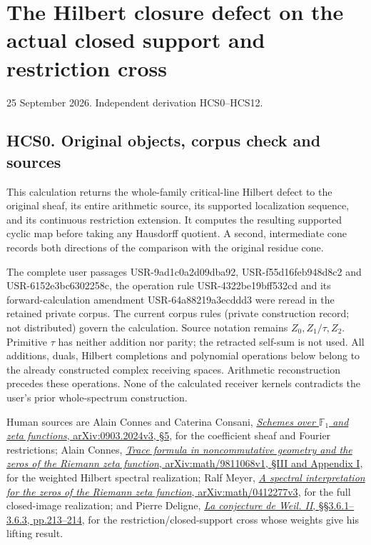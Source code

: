 \section{The Hilbert closure defect on the actual closed support and
restriction
cross}\label{the-hilbert-closure-defect-on-the-actual-closed-support-and-restriction-cross}

25 September 2026. Independent derivation HCS0--HCS12.

\subsection{HCS0. Original objects, corpus check and
sources}\label{hcs0.-original-objects-corpus-check-and-sources}

This calculation returns the whole-family critical-line Hilbert defect
to the original sheaf, its entire arithmetic source, its supported
localization sequence, and its continuous restriction extension. It
computes the resulting supported cyclic map before taking any Hausdorff
quotient. A second, intermediate cone records both directions of the
comparison with the original residue cone.

The complete user passages USR-9ad1c0a2d09dba92, USR-f55d16feb948d8c2
and USR-6152e3bc6302258c, the operation rule USR-4322be19bff532cd and
its forward-calculation amendment USR-64a88219a3ecddd3 were reread in
the retained private corpus. The current corpus rules (private
construction record; not distributed) govern the calculation. Source
notation remains \(Z_0,Z_1/\tau,Z_2\). Primitive \(\tau\) has neither
addition nor parity; the retracted self-sum is not used. All additions,
duals, Hilbert completions and polynomial operations below belong to the
already constructed complex receiving spaces. Arithmetic reconstruction
precedes these operations. None of the calculated receiver kernels
contradicts the user's prior whole-spectrum construction.

Human sources are Alain Connes and Caterina Consani,
\href{https://arxiv.org/abs/0903.2024v3}{\emph{Schemes over
\(\mathbb F_1\) and zeta functions}, arXiv:0903.2024v3, §5}, for the
coefficient sheaf and Fourier restrictions; Alain Connes,
\href{https://arxiv.org/abs/math/9811068v1}{\emph{Trace formula in
noncommutative geometry and the zeros of the Riemann zeta function},
arXiv:math/9811068v1, §III and Appendix I}, for the weighted Hilbert
spectral realization; Ralf Meyer,
\href{https://arxiv.org/abs/math/0412277v3}{\emph{A spectral
interpretation for the zeros of the Riemann zeta function},
arXiv:math/0412277v3}, for the full closed-image realization; and Pierre
Deligne,
\href{https://www.numdam.org/item/PMIHES_1980__52__137_0/}{\emph{La
conjecture de Weil. II}, §§3.6.1--3.6.3, pp.213--214}, for the
restriction/closed-support cross whose weights give his lifting result.

